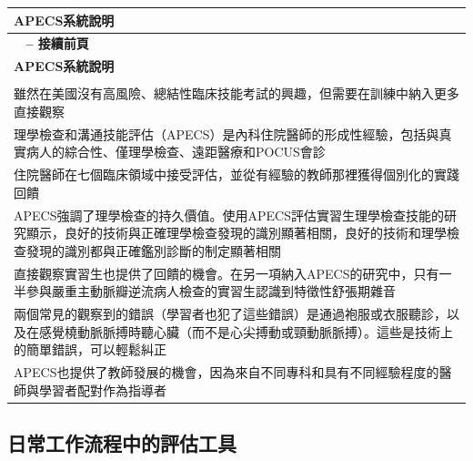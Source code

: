 \documentclass[12pt,a4paper]{article}
\begin{document}
\begin{longtable}{>{\raggedright\arraybackslash}p{15cm}}
\toprule
\textbf{\textcolor{emergency_red}{APECS系統說明}} \\
\midrule
\endfirsthead

\multicolumn{1}{c}%
{{\bfseries \tablename\ \thetable{} -- 接續前頁}} \\
\toprule
\textbf{\textcolor{emergency_red}{APECS系統說明}} \\
\midrule
\endhead

\midrule \multicolumn{1}{r}{{接續下頁}} \\ \midrule
\endfoot

\bottomrule
\endlastfoot

雖然在美國沒有高風險、總結性臨床技能考試的興趣，但需要在訓練中納入更多直接觀察 \\

理學檢查和溝通技能評估（APECS）是內科住院醫師的形成性經驗，包括與真實病人的綜合性、僅理學檢查、遠距醫療和POCUS會診 \\

住院醫師在七個臨床領域中接受評估，並從有經驗的教師那裡獲得個別化的實踐回饋 \\

APECS強調了理學檢查的持久價值。使用APECS評估實習生理學檢查技能的研究顯示，良好的技術與正確理學檢查發現的識別顯著相關，良好的技術和理學檢查發現的識別都與正確鑑別診斷的制定顯著相關 \\

直接觀察實習生也提供了回饋的機會。在另一項納入APECS的研究中，只有一半參與嚴重主動脈瓣逆流病人檢查的實習生認識到特徵性舒張期雜音 \\

兩個常見的觀察到的錯誤（學習者也犯了這些錯誤）是通過袍服或衣服聽診，以及在感覺橈動脈脈搏時聽心臟（而不是心尖搏動或頸動脈脈搏）。這些是技術上的簡單錯誤，可以輕鬆糾正 \\

APECS也提供了教師發展的機會，因為來自不同專科和具有不同經驗程度的醫師與學習者配對作為指導者 \\
\end{longtable}

\subsection{日常工作流程中的評估工具}
\end{document}
